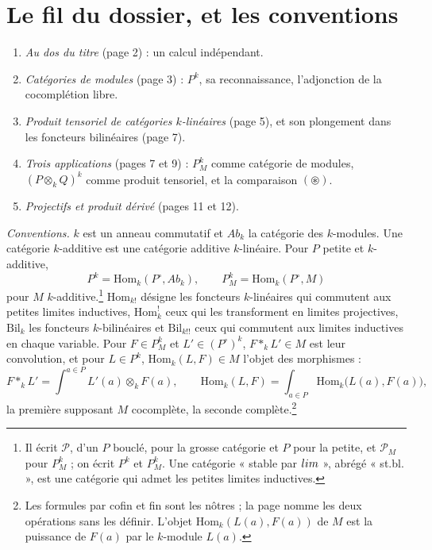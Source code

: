 \documentclass[11pt,a4paper]{article}
\begin{document}
\section*{Le fil du dossier, et les conventions}

\begin{enumerate}
\item[1.] \emph{Au dos du titre} (page 2) : un calcul indépendant.
\item[2.] \emph{Catégories de modules} (page 3) : $P^{k}$, sa reconnaissance,
l'adjonction de la cocomplétion libre.
\item[3.] \emph{Produit tensoriel de catégories $k$-linéaires} (page 5), et
son plongement dans les foncteurs bilinéaires (page 7).
\item[4.] \emph{Trois applications} (pages 7 et 9) : $P^{k}_{M}$ comme catégorie
de modules, $(P \otimes_{k} Q)^{k}$ comme produit tensoriel, et la comparaison
$(\circledast)$.
\item[5.] \emph{Projectifs et produit dérivé} (pages 11 et 12).
\end{enumerate}

\emph{Conventions.} $k$ est un anneau commutatif et $Ab_{k}$ la catégorie des
$k$-modules. Une catégorie $k$-additive est une catégorie additive $k$-linéaire.
Pour $P$ petite et $k$-additive,
\[
P^{k} = \mathrm{Hom}_{k}(P^{\circ}, Ab_{k}),
\qquad
P^{k}_{M} = \mathrm{Hom}_{k}(P^{\circ}, M)
\]
pour $M$ $k$-additive.\footnote{Il écrit $\mathcal{P}$, d'un $P$ bouclé, pour
la grosse catégorie et $P$ pour la petite, et $\mathcal{P}_{M}$ pour
$P^{k}_{M}$ ; on écrit $P^{k}$ et $P^{k}_{M}$. Une catégorie « stable par
$\varinjlim$ », abrégé « st.bl. », est une catégorie qui admet les petites
limites inductives.} $\mathrm{Hom}_{k!}$ désigne les foncteurs $k$-linéaires
qui commutent aux petites limites inductives, $\mathrm{Hom}^{!}_{k}$ ceux qui les
transforment en limites projectives, $\mathrm{Bil}_{k}$ les foncteurs
$k$-bilinéaires et $\mathrm{Bil}_{k!!}$ ceux qui commutent aux limites
inductives en chaque variable. Pour $F \in P^{k}_{M}$ et $L' \in
(P^{\circ})^{k}$, $F *_{k} L' \in M$ est leur convolution, et pour $L \in P^{k}$,
$\mathrm{Hom}_{k}(L, F) \in M$ l'objet des morphismes :
\[
F *_{k} L' = \int^{a \in P} L'(a) \otimes_{k} F(a),
\qquad
\mathrm{Hom}_{k}(L, F) = \int_{a \in P} \mathrm{Hom}_{k}\bigl(L(a), F(a)\bigr),
\]
la première supposant $M$ cocomplète, la seconde complète.\footnote{Les
formules par cofin et fin sont les nôtres ; la page nomme les deux opérations
sans les définir. L'objet $\mathrm{Hom}_{k}(L(a), F(a))$ de $M$ est la
puissance de $F(a)$ par le $k$-module $L(a)$.}
\end{document}
